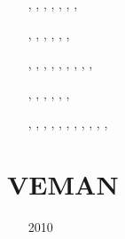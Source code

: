 \begin{small}
\begin{itemize}
                             \textcite{smbc19},  \textcite{canc19b}
\item[\twothousandtwenty]      \textcite{magm20},  \textcite{sams20},  \textcite{capi20}, 
                               \textcite{ghbm20},  \textcite{canc20},  \textcite{cofm20},
                               \textcite{gumc20},  \textcite{sche20}
\item[\twothousandtwentyone]   \textcite{kotr21},  \textcite{qizx21},
                               \textcite{stsc21},  \textcite{zhzl21}, \textcite{scst21},
                               \textcite{xiwk21},  \textcite{kncw21}
\item[\twothousandtwentytwo]   \textcite{wakw22},  \textcite{alrr22b}, \textcite{pefv22},
                               \textcite{olgr22},  \textcite{bahf22},  \textcite{canm22},
                               \textcite{wacw22},  \textcite{baha22},  \textcite{zugc22},
                               \textcite{aryt22}
\item[\twothousandtwentythree] \textcite{lass23}, \textcite{giln23}, \textcite{yaat23},
                               \textcite{scsb23}, \textcite{mord23}, \textcite{ligu23a},
                               \textcite{ligu23b}
\item[\twothousandtwentyfour]  \textcite{deyz24}, \textcite{gucm24}, \textcite{yuga24},
                               \textcite{comi24}, \textcite{waxu24}, \textcite{caks24},
                               \textcite{shmo24}, \textcite{licc24}, \textcite{lihl24},
                               \textcite{chrm24}, \textcite{malb24}, \textcite{fagl24}
\item[\twothousandtwentyfive]  \textcite{walc25}
\end{itemize}
\end{small}



\section{VEMAN}

\begin{small}
\begin{itemize}
\item[2010] \textcite{bepo10}
\end{itemize}
\end{small}


